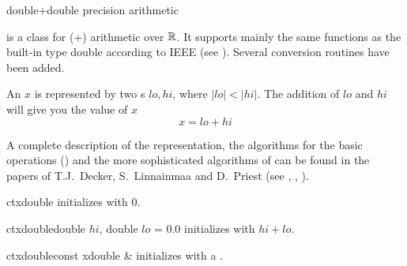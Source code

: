 


\NAME

 \dotfill double+double precision arithmetic



\ABSTRACT

 is a class for (+) arithmetic over $\mathbb{R}$.  It
supports mainly the same functions as the built-in type double according to IEEE (see
\cite{IEEE:754}).  Several conversion routines have been added.



\DESCRIPTION

An  $x$ is represented by two s $\mathit{lo}, \mathit{hi}$, where
$|\mathit{lo}| < |\mathit{hi}|$.  The addition of $\mathit{lo}$ and $\mathit{hi}$ will give you
the value of $x$
\begin{displaymath}
  x = \mathit{lo} + \mathit{hi}
\end{displaymath}

A complete description of the representation, the algorithms for the basic operations (\code{+,
  -, *, /}) and the more sophisticated algorithms of  can be found in the papers
of T.J.~Decker, S.~Linnainmaa and D.~Priest (see \cite{Dekker:1971}, \cite{Linnainmaa:1981}, \cite{Priest:1992}).



\CONS

\begin{fcode}{ct}{xdouble}{}
  initializes with 0.
\end{fcode}

\begin{fcode}{ct}{xdouble}{double $\mathit{hi}$, double $\mathit{lo}$ = 0.0}
  initializes with $\mathit{hi} + \mathit{lo}$. 
\end{fcode}

\begin{fcode}{ct}{xdouble}{const xdouble &}
  initializes with a .
\end{fcode}

